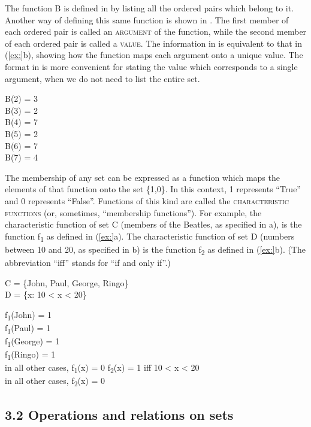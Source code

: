 The function B is defined in  by listing all the ordered pairs which belong to it. Another way of defining this same function is shown in . The first member of each ordered pair is called an \textsc{argument} of the function, while the second member of each ordered pair is called a \textsc{value}. The information in  is equivalent to that in (\ref{ex:}b), showing how the function maps each argument onto a unique value. The format in  is more convenient for stating the value which corresponds to a single argument, when we do not need to list the entire set.


\ea
B(2) = 3\\
B(3) = 2\\
B(4) = 7\\
B(5) = 2\\
B(6) = 7\\
B(7) = 4
\z


The membership of any set can be expressed as a function which maps the elements of that function onto the set \{1,0\}. In this context, 1 represents “True” and 0 represents “False”. Functions of this kind are called the \textsc{characteristic functions} (or, sometimes, “membership functions”). For example, the characteristic function of set C (members of the Beatles, as specified in a), is the function f\textsubscript{1} as defined in (\ref{ex:}a). The characteristic function of set D (numbers between 10 and 20, as specified in b) is the function f\textsubscript{2} as defined in (\ref{ex:}b). (The abbreviation “iff” stands for “if and only if”.)


\ea
\ea C = \{John, Paul, George, Ringo\}\\
\ex D = \{x: 10 < x < 20\}
                       \z
\z

\ea
\ea  f\textsubscript{1}(John) = 1\\
f\textsubscript{1}(Paul) = 1\\
f\textsubscript{1}(George) = 1\\
f\textsubscript{1}(Ringo) = 1\\
in all other cases, f\textsubscript{1}(x) = 0
\ex f\textsubscript{2}(x) = 1 iff 10 < x < 20\\
in all other cases, f\textsubscript{2}(x) = 0
\z \z

\subsection{3.2  Operations and relations on sets}\label{sec:}

